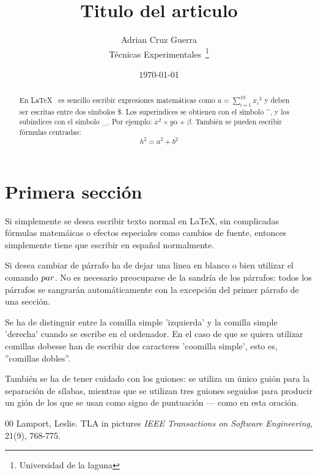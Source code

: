 \documentclass[a4paper, 12pt]{article}
\begin{document}
\title {Titulo del articulo}
\author {Adrian Cruz Guerra\\
	    Técnicas Experimentales~\footnote{Universidad de la laguna}
	    }
\date {\today}
\maketitle
\begin{abstract}
  En \LaTeX {}~\cite{Lam:86} es sencillo escribir expresiones 
  matemáticas como $a=\sum_{i=1}^{10} {x_i}^{3}$
  y deben ser escritas entre dos símbolos \$.
  Los superíndices se obtienen con el símbolo \^{}, y
  los subíndices con el símbolo \_.
  Por ejemplo: $x^2 \times y {\alpha + \beta}$.
  También se pueden escribir fórmulas centradas:
  \[h^2=a^2 + b^2\]
\end {abstract}

\section {Primera sección}
Si simplemente se desea escribir texto normal en LaTeX,
sin complicadas f\'ormulas matem\'aicas o efectos especiales
como cambios de fuente, entonces simplemente tiene que escribir
en espa\~nol normalmente. \par
Si desea cambiar de párrafo ha de dejar una linea en blanco o bien
utilizar el comando $\\par$.
No es necesario preocuparse de la sandría de los párrafos:
todos los párrafos se sangrarán automáticamente con la excepción
del primer párrafo de una sección.


Se ha de distinguir entre la comilla simple 'izquierda'
y la comilla simple 'derecha' cuando se escribe en el ordenador.
En el caso de que se quiera utilizar comillas dobesse han de escribir
dos caracteres 'coomilla simple', esto es, 
''comillas dobles''.


También se ha de tener cuidado con los guiones: se utiliza un único
guión para la separación de sílabas, mientras que se utilizan 
tres guiones seguidos para producir un gión de los que se usan 
como signo de puntuación --- como en esta oración.
\begin {thebibliography}{00}
    Lamport, Leslie.
    TLA in pictures
    \emph {IEEE Transactions on Software Engineering},
    21(9), 768-775.
\end {thebibliography}
\end{document}

